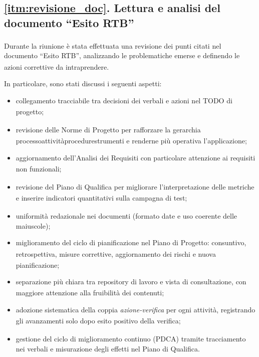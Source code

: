 \documentclass[a4paper,12pt]{article}
\begin{document}
\subsection*{\ref{itm:revisione_doc}. Lettura e analisi del documento ``Esito RTB\textsubscript{}''} 

Durante la riunione è stata effettuata una revisione dei punti citati nel documento ``Esito RTB\textsubscript{}'', 
analizzando le problematiche emerse e definendo le azioni correttive da intraprendere.

In particolare, sono stati discussi i seguenti aspetti:
\begin{itemize}
  \item collegamento tracciabile tra decisioni dei verbali\textsubscript{} e azioni nel TODO di progetto\textsubscript{};
  \item revisione delle Norme di Progetto\textsubscript{} per rafforzare la gerarchia processo{\textendash}attività{\textendash}procedure{\textendash}strumenti e renderne più operativa l'applicazione;
  \item aggiornamento dell'Analisi dei Requisiti\textsubscript{} con particolare attenzione ai requisiti non funzionali\textsubscript{};
  \item revisione del Piano di Qualifica\textsubscript{} per migliorare l'interpretazione delle metriche e inserire indicatori quantitativi sulla campagna di test\textsubscript{};
  \item uniformità redazionale nei documenti (formato date e uso coerente delle maiuscole);
  \item miglioramento del ciclo di pianificazione nel Piano di Progetto\textsubscript{}: consuntivo\textsubscript{}, retrospettiva\textsubscript{}, misure correttive, aggiornamento dei rischi e nuova pianificazione;
  \item separazione più chiara tra repository\textsubscript{} di lavoro e vista di consultazione, con maggiore attenzione alla fruibilità dei contenuti;
  \item adozione sistematica della coppia \textit{azione-verifica}\textsubscript{} per ogni attività, registrando gli avanzamenti solo dopo esito positivo della verifica\textsubscript{};
  \item gestione del ciclo di miglioramento continuo (PDCA) tramite tracciamento nei verbali e misurazione degli effetti nel Piano di Qualifica\textsubscript{}.
\end{itemize}
\end{document}
